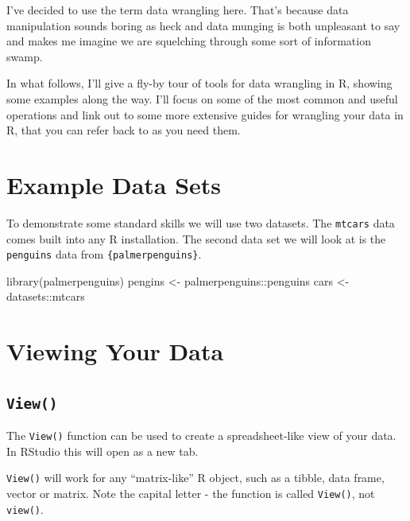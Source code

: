 \documentclass[
  12pt,
]{book}
\newenvironment{Shaded}{\begin{snugshade}}{\end{snugshade}}
\newcommand{\FunctionTok}[1]{\textcolor[rgb]{0.00,0.00,0.00}{#1}}
\newcommand{\NormalTok}[1]{#1}
\newcommand{\OtherTok}[1]{\textcolor[rgb]{0.56,0.35,0.01}{#1}}
\newcommand{\SpecialCharTok}[1]{\textcolor[rgb]{0.00,0.00,0.00}{#1}}
\begin{document}
I've decided to use the term data wrangling here. That's because data manipulation sounds boring as heck and data munging is both unpleasant to say and makes me imagine we are squelching through some sort of information swamp.

In what follows, I'll give a fly-by tour of tools for data wrangling in R, showing some examples along the way. I'll focus on some of the most common and useful operations and link out to some more extensive guides for wrangling your data in R, that you can refer back to as you need them.

\hypertarget{example-data-sets}{%
\section{Example Data Sets}\label{example-data-sets}}

To demonstrate some standard skills we will use two datasets. The \texttt{mtcars} data comes built into any R installation. The second data set we will look at is the \texttt{penguins} data from \texttt{\{palmerpenguins\}}.

\begin{Shaded}
\begin{Highlighting}[]
\FunctionTok{library}\NormalTok{(palmerpenguins)}
\NormalTok{pengins }\OtherTok{\textless{}{-}}\NormalTok{ palmerpenguins}\SpecialCharTok{::}\NormalTok{penguins}
\NormalTok{cars }\OtherTok{\textless{}{-}}\NormalTok{ datasets}\SpecialCharTok{::}\NormalTok{mtcars}
\end{Highlighting}
\end{Shaded}

\hypertarget{viewing-your-data}{%
\section{Viewing Your Data}\label{viewing-your-data}}

\hypertarget{view}{%
\subsection{\texorpdfstring{\texttt{View()}}{View()}}\label{view}}

The \texttt{View()} function can be used to create a spreadsheet-like view of your data. In RStudio this will open as a new tab.

\texttt{View()} will work for any ``matrix-like'' R object, such as a tibble, data frame, vector or matrix. Note the capital letter - the function is called \texttt{View()}, not \texttt{view()}.
\end{document}
